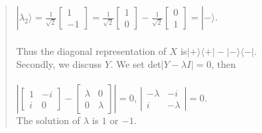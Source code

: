 \documentclass[UTF8]{ctexart}
\begin{document}
\begin{quote}
	$|\lambda_{2}\rangle=\frac{1}{\sqrt{2}}\begin{bmatrix}1\\-1\end{bmatrix}
	=\frac{1}{\sqrt{2}}\begin{bmatrix}1\\0\end{bmatrix}-\frac{1}{\sqrt{2}}\begin{bmatrix}0\\1\end{bmatrix}
	=|-\rangle$.
	\\ \\
	Thus the diagonal representation of $X$ is$|+\rangle\langle+|-|-\rangle\langle-|.$ \\ 
	Secondly, we discuss $Y$. We set  det$|Y-\lambda I|=0$, then\\  \\
	$\left| \begin{bmatrix}1&-i\\i& 0\end{bmatrix}-\begin{bmatrix}\lambda&0\\0&\lambda\end{bmatrix} \right |=0$,
	$\left|\begin{array}{cccc} -\lambda&-i\\i&-\lambda \end{array}\right| =0. $ \\

	The solution of $\lambda$  is $1$ or $-1$.
	

\end{quote}
\end{document}

